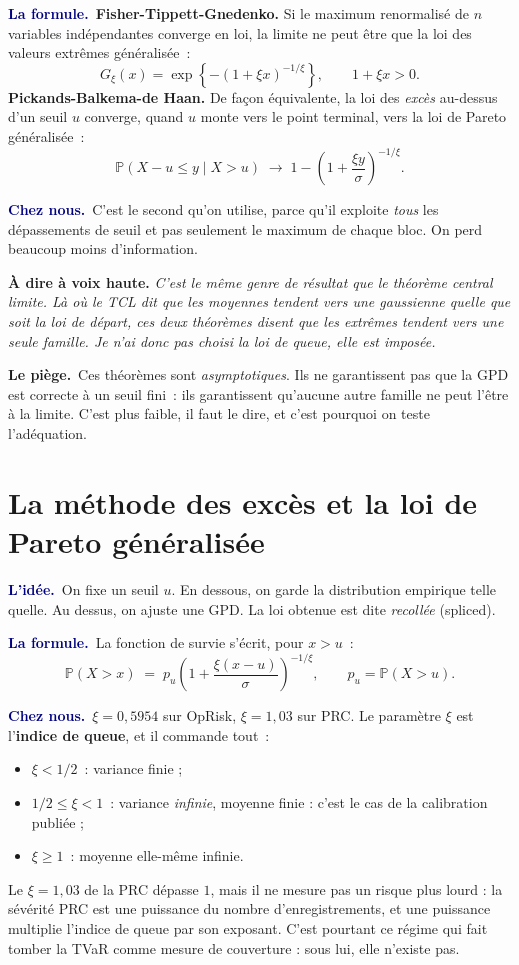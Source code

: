 \documentclass[11pt,a4paper]{article}
\newcommand{\lidee}[1]{\smallskip\noindent\textcolor{navy}{\textbf{L'idée.}}\ #1\par}
\newcommand{\laformule}[1]{\smallskip\noindent\textcolor{navy}{\textbf{La formule.}}\ #1\par}
\newcommand{\cheznous}[1]{\smallskip\noindent\textcolor{navy}{\textbf{Chez nous.}}\ #1\par}
\newcommand{\lepiege}[1]{\smallskip\noindent\textcolor{accent}{\textbf{Le piège.}}\ #1\par}
\newcommand{\laphrase}[1]{\begin{phrasebox}\textbf{À dire à voix haute.} \emph{#1}\end{phrasebox}}
\begin{document}
\laformule{\textbf{Fisher-Tippett-Gnedenko.} Si le maximum renormalisé de $n$ variables
indépendantes converge en loi, la limite ne peut être que la loi des valeurs extrêmes
généralisée~:
\[
  G_\xi(x)=\exp\!\left\{-\left(1+\xi x\right)^{-1/\xi}\right\}, \qquad 1+\xi x>0 .
\]
\textbf{Pickands-Balkema-de Haan.} De façon équivalente, la loi des \emph{excès} au-dessus
d'un seuil $u$ converge, quand $u$ monte vers le point terminal, vers la loi de Pareto
généralisée~:
\[
  \mathbb{P}(X-u\le y \mid X>u)\;\longrightarrow\;
  1-\left(1+\frac{\xi y}{\sigma}\right)^{-1/\xi}.
\]}

\cheznous{C'est le second qu'on utilise, parce qu'il exploite \emph{tous} les dépassements
de seuil et pas seulement le maximum de chaque bloc. On perd beaucoup moins d'information.}

\laphrase{C'est le même genre de résultat que le théorème central limite. Là où le TCL dit
que les moyennes tendent vers une gaussienne quelle que soit la loi de départ, ces deux
théorèmes disent que les extrêmes tendent vers une seule famille. Je n'ai donc pas
\emph{choisi} la loi de queue, elle est imposée.}

\lepiege{Ces théorèmes sont \emph{asymptotiques}. Ils ne garantissent pas que la GPD est
correcte à un seuil fini~: ils garantissent qu'aucune autre famille ne peut l'être à la
limite. C'est plus faible, il faut le dire, et c'est pourquoi on teste l'adéquation.}

\section{La méthode des excès et la loi de Pareto généralisée}

\lidee{On fixe un seuil $u$. En dessous, on garde la distribution empirique telle quelle. Au
dessus, on ajuste une GPD. La loi obtenue est dite \emph{recollée} (spliced).}

\laformule{La fonction de survie s'écrit, pour $x>u$~:
\[
  \mathbb{P}(X>x)\;=\;p_u\left(1+\frac{\xi (x-u)}{\sigma}\right)^{-1/\xi},
  \qquad p_u=\mathbb{P}(X>u).
\]}

\cheznous{$\xi=0{,}5954$ sur OpRisk, $\xi=1{,}03$ sur PRC. Le paramètre $\xi$ est
l'\textbf{indice de queue}, et il commande tout~:
\begin{itemize}[itemsep=1pt,topsep=2pt]
\item $\xi<1/2$~: variance finie ;
\item $1/2\le\xi<1$~: variance \emph{infinie}, moyenne finie : c'est le cas de la calibration
publiée ;
\item $\xi\ge1$~: moyenne elle-même infinie.
\end{itemize}
Le $\xi=1{,}03$ de la PRC dépasse $1$, mais il ne mesure pas un risque plus lourd : la sévérité
PRC est une puissance du nombre d'enregistrements, et une puissance multiplie l'indice de queue par
son exposant. C'est pourtant ce régime qui fait tomber la TVaR comme mesure de couverture : sous
lui, elle n'existe pas.}
\end{document}
